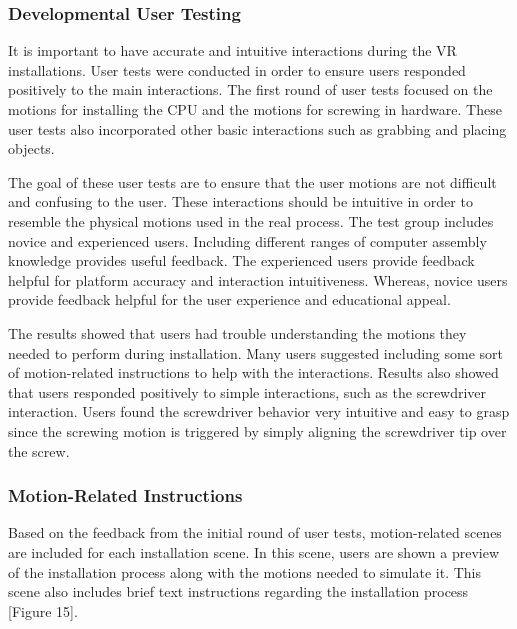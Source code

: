 \documentclass[10pt,twocolumn]{article}
\begin{document}
\subsubsection{Developmental User Testing}

\par It is important to have accurate and intuitive interactions during the VR installations. User tests were conducted in order to ensure users responded positively to the main interactions. The first round of user tests focused on the motions for installing the CPU and the motions for screwing in hardware. These user tests also incorporated other basic interactions such as grabbing and placing objects. 

\par The goal of these user tests are to ensure that the user motions are not difficult and confusing to the user. These interactions should be intuitive in order to resemble the physical motions used in the real process. The test group includes novice and experienced users. Including different ranges of computer assembly knowledge provides useful feedback. The experienced users provide feedback helpful for platform accuracy and interaction intuitiveness. Whereas, novice users provide feedback helpful for the user experience and educational appeal.

\par The results showed that users had trouble understanding the motions they needed to perform during installation. Many users suggested including some sort of motion-related instructions to help with the interactions. Results also showed that users responded positively to simple interactions, such as the screwdriver interaction. Users found the screwdriver behavior very intuitive and easy to grasp since the screwing motion is triggered by simply aligning the screwdriver tip over the screw. 

\subsubsection{Motion-Related Instructions}

\par Based on the feedback from the initial round of user tests, motion-related scenes are included for each installation scene. In this scene, users are shown a preview of the installation process along with the motions needed to simulate it. This scene also includes brief text instructions regarding the installation process [Figure 15]. 
\end{document}
